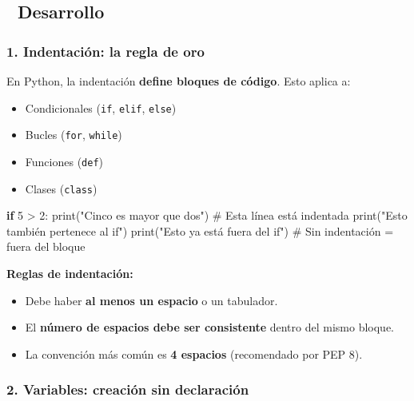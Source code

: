 \documentclass[
  doc,
  floatsintext,
  longtable,
  a4paper,
  nolmodern,
  notxfonts,
  notimes,
  12pt,
  colorlinks=true,linkcolor=blue,citecolor=blue,urlcolor=blue]{apa7}
\newenvironment{Shaded}{\begin{snugshade}}{\end{snugshade}}
\newcommand{\BuiltInTok}[1]{\textcolor[rgb]{0.00,0.23,0.31}{#1}}
\newcommand{\CommentTok}[1]{\textcolor[rgb]{0.37,0.37,0.37}{#1}}
\newcommand{\ControlFlowTok}[1]{\textcolor[rgb]{0.00,0.23,0.31}{\textbf{#1}}}
\newcommand{\DecValTok}[1]{\textcolor[rgb]{0.68,0.00,0.00}{#1}}
\newcommand{\NormalTok}[1]{\textcolor[rgb]{0.00,0.23,0.31}{#1}}
\newcommand{\OperatorTok}[1]{\textcolor[rgb]{0.37,0.37,0.37}{#1}}
\newcommand{\StringTok}[1]{\textcolor[rgb]{0.13,0.47,0.30}{#1}}
\providecommand{\tightlist}{%
  \setlength{\itemsep}{0pt}\setlength{\parskip}{0pt}}
\begin{document}
\subsection{📐 Desarrollo}\label{desarrollo}

\subsubsection{1. Indentación: la regla de
oro}\label{indentaciuxf3n-la-regla-de-oro}

En Python, la indentación \textbf{define bloques de código}. Esto aplica
a:

\begin{itemize}
\tightlist
\item
  Condicionales (\texttt{if}, \texttt{elif}, \texttt{else})
\item
  Bucles (\texttt{for}, \texttt{while})
\item
  Funciones (\texttt{def})
\item
  Clases (\texttt{class})
\end{itemize}

\begin{Shaded}
\begin{Highlighting}[]
\ControlFlowTok{if} \DecValTok{5} \OperatorTok{\textgreater{}} \DecValTok{2}\NormalTok{:}
    \BuiltInTok{print}\NormalTok{(}\StringTok{"Cinco es mayor que dos"}\NormalTok{)  }\CommentTok{\# Esta línea está indentada}
    \BuiltInTok{print}\NormalTok{(}\StringTok{"Esto también pertenece al if"}\NormalTok{)}
\BuiltInTok{print}\NormalTok{(}\StringTok{"Esto ya está fuera del if"}\NormalTok{)   }\CommentTok{\# Sin indentación = fuera del bloque}
\end{Highlighting}
\end{Shaded}

\textbf{Reglas de indentación:}

\begin{itemize}
\tightlist
\item
  Debe haber \textbf{al menos un espacio} o un tabulador.
\item
  El \textbf{número de espacios debe ser consistente} dentro del mismo
  bloque.
\item
  La convención más común es \textbf{4 espacios} (recomendado por PEP
  8).
\end{itemize}

\subsubsection{2. Variables: creación sin
declaración}\label{variables-creaciuxf3n-sin-declaraciuxf3n}
\end{document}
